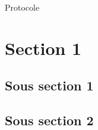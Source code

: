 \minitoc
\newpage



Protocole



\section{Section 1}
\subsection{Sous section 1}
\blindtext
\subsection{Sous section 2}
\blindtext



